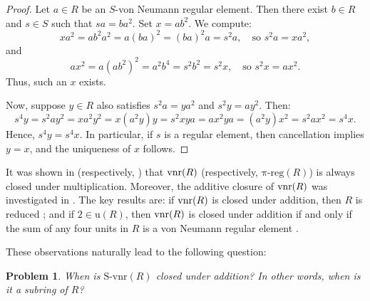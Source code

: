 \documentclass[12pt]{article}
\newtheorem{pb}[thm]{\bf Problem}
\def\Svnr{\mathrm{S\text{-}vnr}}
\def\preg{\mathrm{\pi\text{-}reg}}
\def\u{\mathrm{u}}
\def\idem{{\rm idem}}
\def\vnr{{\rm vnr}}
\begin{document}
\begin{proof}
Let \( a \in R \) be an \( S \)-von Neumann regular element. Then there exist \( b \in R \) and \( s \in S \) such that \( sa = ba^2 \). Set \( x = ab^2 \). We compute:
\[
xa^2 = ab^2a^2 = a(ba)^2 = (ba)^2a = s^2a, \quad \text{so } s^2a = xa^2,
\]
and
\[
ax^2 = a(ab^2)^2 = a^2b^4 = s^2b^2 = s^2x, \quad \text{so } s^2x = ax^2.
\]
Thus, such an \( x \) exists.

Now, suppose \( y \in R \) also satisfies \( s^2a = ya^2 \) and \( s^2y = ay^2 \). Then:
\[
s^4y = s^2a y^2 = x a^2 y^2 = x (a^2 y) y = s^2 x y a =  a x^2 y a = (a^2 y) x^2 = s^2 a x^2 = s^4 x.
\]
Hence, \( s^4 y = s^4 x \). In particular, if \( s \) is a regular element, then cancellation implies \( y = x \), and the uniqueness of \( x \) follows.
\end{proof}





















 



It was shown in \cite[Theorem 2.1]{And1} (respectively, \cite[Theorem 4.1]{And1}) that \( \vnr(R) \) (respectively, \( \preg(R) \)) is always closed under multiplication. Moreover, the additive closure of \( \vnr(R) \) was investigated in \cite[Theorems 2.9 and 2.11]{And1}. The key results are: if \( \vnr(R) \) is closed under addition, then \( R \) is reduced \cite[Theorem 2.9]{And1}; and if \( 2 \in \u(R) \), then \( \vnr(R) \) is closed under addition if and only if the sum of any four units in \( R \) is a von Neumann regular element \cite[Theorem 2.11]{And1}.

These observations naturally lead to the following question:

\begin{pb}\label{problem1}
When is \( \Svnr(R) \) closed under addition? In other words, when is it a subring of \( R \)?
\end{pb}

 
\end{document}
